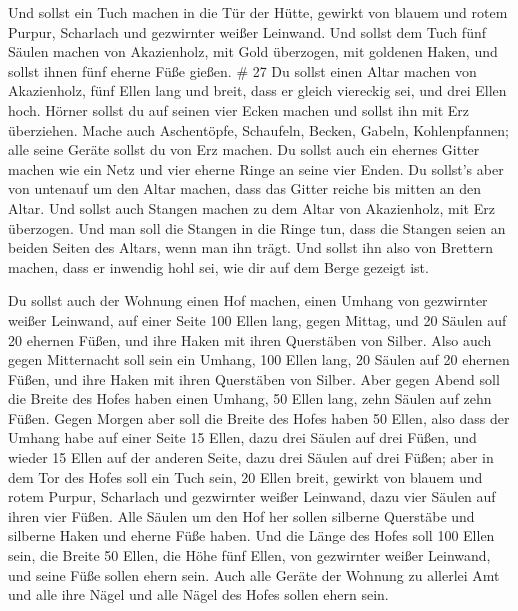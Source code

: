  Und sollst ein Tuch machen in die Tür der Hütte, gewirkt
von blauem und rotem Purpur, Scharlach und gezwirnter weißer Leinwand.
 Und sollst dem Tuch fünf Säulen machen von Akazienholz,
mit Gold überzogen, mit goldenen Haken, und sollst ihnen fünf eherne
Füße gießen. \# 27  Du sollst einen Altar machen von
Akazienholz, fünf Ellen lang und breit, dass er gleich viereckig sei,
und drei Ellen hoch.  Hörner sollst du auf seinen vier Ecken
machen und sollst ihn mit Erz überziehen.  Mache auch
Aschentöpfe, Schaufeln, Becken, Gabeln, Kohlenpfannen; alle seine Geräte
sollst du von Erz machen.  Du sollst auch ein ehernes Gitter
machen wie ein Netz und vier eherne Ringe an seine vier Enden.
 Du sollst's aber von untenauf um den Altar machen, dass das
Gitter reiche bis mitten an den Altar.  Und sollst auch
Stangen machen zu dem Altar von Akazienholz, mit Erz überzogen.
 Und man soll die Stangen in die Ringe tun, dass die Stangen
seien an beiden Seiten des Altars, wenn man ihn trägt.  Und
sollst ihn also von Brettern machen, dass er inwendig hohl sei, wie dir
auf dem Berge gezeigt ist.

 Du sollst auch der Wohnung einen Hof machen, einen Umhang
von gezwirnter weißer Leinwand, auf einer Seite 100 Ellen lang, gegen
Mittag,  und 20 Säulen auf 20 ehernen Füßen, und ihre Haken
mit ihren Querstäben von Silber.  Also auch gegen
Mitternacht soll sein ein Umhang, 100 Ellen lang, 20 Säulen auf 20
ehernen Füßen, und ihre Haken mit ihren Querstäben von Silber.
 Aber gegen Abend soll die Breite des Hofes haben einen
Umhang, 50 Ellen lang, zehn Säulen auf zehn Füßen.  Gegen
Morgen aber soll die Breite des Hofes haben 50 Ellen,  also
dass der Umhang habe auf einer Seite 15 Ellen, dazu drei Säulen auf drei
Füßen,  und wieder 15 Ellen auf der anderen Seite, dazu
drei Säulen auf drei Füßen;  aber in dem Tor des Hofes soll
ein Tuch sein, 20 Ellen breit, gewirkt von blauem und rotem Purpur,
Scharlach und gezwirnter weißer Leinwand, dazu vier Säulen auf ihren
vier Füßen.  Alle Säulen um den Hof her sollen silberne
Querstäbe und silberne Haken und eherne Füße haben.  Und
die Länge des Hofes soll 100 Ellen sein, die Breite 50 Ellen, die Höhe
fünf Ellen, von gezwirnter weißer Leinwand, und seine Füße sollen ehern
sein.  Auch alle Geräte der Wohnung zu allerlei Amt und
alle ihre Nägel und alle Nägel des Hofes sollen ehern sein.

